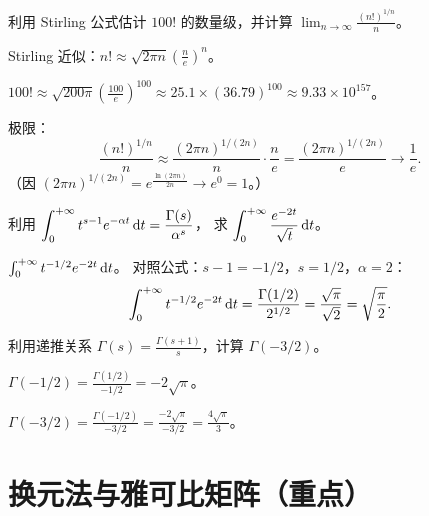 \documentclass{ctexart}
\begin{document}
\begin{exercise}
  利用 Stirling 公式估计 $100!$ 的数量级，并计算 $\displaystyle\lim_{n\to\infty}\frac{(n!)^{1/n}}{n}$。
\end{exercise}

\begin{solution}
  Stirling 近似：$n! \approx \sqrt{2\pi n}\left(\frac{n}{e}\right)^n$。

  $100! \approx \sqrt{200\pi}\left(\frac{100}{e}\right)^{100}
  \approx 25.1 \times (36.79)^{100}
  \approx 9.33 \times 10^{157}$。

  极限：
  \[
    \frac{(n!)^{1/n}}{n}
    \approx \frac{(2\pi n)^{1/(2n)}}{n}\cdot\frac{n}{e}
    = \frac{(2\pi n)^{1/(2n)}}{e}
    \to \frac{1}{e}.
  \]
  （因 $(2\pi n)^{1/(2n)} = e^{\frac{\ln(2\pi n)}{2n}} \to e^0 = 1$。）
\end{solution}

\begin{exercise}
  利用 $\displaystyle\int_0^{+\infty} t^{s-1}e^{-\alpha t}\,\mathrm{d} t = \frac{\Gamma(s)}{\alpha^s}$，
  求 $\displaystyle\int_0^{+\infty}\frac{e^{-2t}}{\sqrt{t}}\,\mathrm{d} t$。
\end{exercise}

\begin{solution}
  $\int_0^{+\infty}t^{-1/2}e^{-2t}\,\mathrm{d} t$。
  对照公式：$s-1 = -1/2$，$s = 1/2$，$\alpha = 2$：
  \[
    \int_0^{+\infty}t^{-1/2}e^{-2t}\,\mathrm{d} t
    = \frac{\Gamma(1/2)}{2^{1/2}}
    = \frac{\sqrt{\pi}}{\sqrt{2}}
    = \sqrt{\frac{\pi}{2}}.
  \]
\end{solution}

\begin{exercise}[解析延拓计算]
  利用递推关系 $\Gamma(s) = \frac{\Gamma(s+1)}{s}$，计算 $\Gamma(-3/2)$。
\end{exercise}

\begin{solution}
  $\Gamma(-1/2) = \frac{\Gamma(1/2)}{-1/2} = -2\sqrt{\pi}$。

  $\Gamma(-3/2) = \frac{\Gamma(-1/2)}{-3/2} = \frac{-2\sqrt{\pi}}{-3/2} = \frac{4\sqrt{\pi}}{3}$。
\end{solution}


\section{换元法与雅可比矩阵（重点）}
\label{sec:jacobian}
\end{document}
